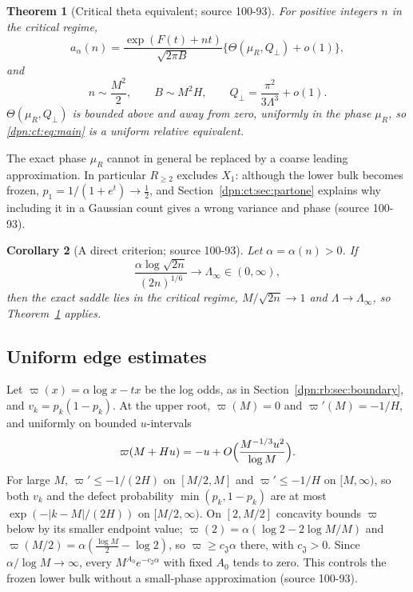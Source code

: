 \documentclass[11pt]{article}
\numberwithin{equation}{section}
\newtheorem{theorem}{Theorem}[section]
\newtheorem{corollary}[theorem]{Corollary}
\theoremstyle{definition}\newtheorem{definition}[theorem]{Definition}
\theoremstyle{remark}\newtheorem{remark}[theorem]{Remark}
\newcommand{\src}[1]{\textup{(source #1)}}
\begin{document}
\begin{theorem}[Critical theta equivalent; source 100-93]\label{dpn:ct:thm:theta}
For positive integers $n$ in the critical regime,
\begin{equation}\label{dpn:ct:eq:main}
 a_\alpha(n)=\frac{\exp(F(t)+nt)}{\sqrt{2\pi B}}
          \bigl\{\Theta(\mu_R,Q_\perp)+o(1)\bigr\},
\end{equation}
and
\begin{equation}\label{dpn:ct:eq:limits}
 n\sim\frac{M^2}{2},\qquad B\sim M^2H,\qquad
 Q_\perp=\frac{\pi^2}{3\Lambda^3}+o(1).
\end{equation}
$\Theta(\mu_R,Q_\perp)$ is bounded above and away from zero, uniformly in the
phase $\mu_R$, so \eqref{dpn:ct:eq:main} is a uniform relative equivalent.
\end{theorem}
The exact phase $\mu_R$ cannot in general be replaced by a coarse leading
approximation.  In particular $R_{\ge2}$ excludes $X_1$: although the lower
bulk becomes frozen, $p_1=1/(1+e^t)\to\frac12$, and
Section~\ref{dpn:ct:sec:partone} explains why including it in a Gaussian count
gives a wrong variance and phase \src{100-93}.

\begin{corollary}[A direct criterion; source 100-93]\label{dpn:ct:cor:direct}
Let $\alpha=\alpha(n)>0$.  If
\begin{equation}\label{dpn:ct:eq:direct}
 \frac{\alpha\log\sqrt{2n}}{(2n)^{1/6}}\longrightarrow\Lambda_\infty\in(0,\infty),
\end{equation}
then the exact saddle lies in the critical regime, $M/\sqrt{2n}\to1$ and
$\Lambda\to\Lambda_\infty$, so Theorem~\ref{dpn:ct:thm:theta} applies.
\end{corollary}

\subsection{Uniform edge estimates}\label{dpn:ct:sec:edge}
Let $\varpi(x)=\alpha\log x-tx$ be the log odds, as in
Section~\ref{dpn:rb:sec:boundary}, and $v_k=p_k(1-p_k)$.  At the upper root,
$\varpi(M)=0$ and $\varpi'(M)=-1/H$, and uniformly on bounded $u$-intervals
\begin{equation}\label{dpn:ct:eq:edgeprofile}
 \varpi(M+Hu)=-u+O\Bigl(\frac{M^{-1/3}u^2}{\log M}\Bigr).
\end{equation}
For large $M$, $\varpi'\le-1/(2H)$ on $[M/2,M]$ and $\varpi'\le-1/H$ on
$[M,\infty)$, so both $v_k$ and the defect probability $\min(p_k,1-p_k)$ are
at most $\exp(-|k-M|/(2H))$ on $[M/2,\infty)$.  On $[2,M/2]$ concavity bounds
$\varpi$ below by its smaller endpoint value; $\varpi(2)=\alpha(\log2-2\log M/M)$
and $\varpi(M/2)=\alpha(\frac{\log M}2-\log2)$, so $\varpi\ge c_{\mathfrak J}\alpha$
there, with $c_{\mathfrak J}>0$.  Since $\alpha/\log M\to\infty$, every
$M^{A_0}e^{-c_{\mathfrak J}\alpha}$ with fixed $A_0$ tends to zero.  This
controls the frozen lower bulk without a small-phase approximation
\src{100-93}.
\end{document}
